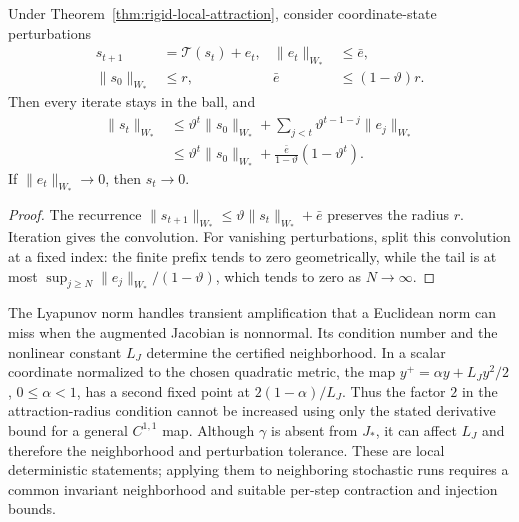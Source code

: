 \begin{corollary}
\label{cor:rigid-local-robustness}
Under Theorem~\ref{thm:rigid-local-attraction}, consider coordinate-state perturbations
\begin{align}
 s_{t+1}&=\mathcal T(s_t)+e_t,&\|e_t\|_{W_*}&\le\bar e,\\
 \|s_0\|_{W_*}&\le r,&\bar e&\le(1-\vartheta)r.
\end{align}
Then every iterate stays in the ball, and
\begin{align}
 \|s_t\|_{W_*}
 &\le\vartheta^t\|s_0\|_{W_*}
 +\sum_{j<t}\vartheta^{t-1-j}\|e_j\|_{W_*}\\
 &\le\vartheta^t\|s_0\|_{W_*}
 +\frac{\bar e}{1-\vartheta}(1-\vartheta^t).
\end{align}
If $\|e_t\|_{W_*}\to0$, then $s_t\to0$.
\end{corollary}
\begin{proof}
The recurrence $\|s_{t+1}\|_{W_*}\le\vartheta\|s_t\|_{W_*}+\bar e$ preserves the radius $r$. Iteration gives the convolution. For vanishing perturbations, split this convolution at a fixed index: the finite prefix tends to zero geometrically, while the tail is at most $\sup_{j\ge N}\|e_j\|_{W_*}/(1-\vartheta)$, which tends to zero as $N\to\infty$.
\end{proof}

The Lyapunov norm handles transient amplification that a Euclidean norm can miss when the augmented Jacobian is nonnormal. Its condition number and the nonlinear constant $L_J$ determine the certified neighborhood. In a scalar coordinate normalized to the chosen quadratic metric, the map $y^+=\alpha y+L_Jy^2/2$, $0\le\alpha<1$, has a second fixed point at $2(1-\alpha)/L_J$. Thus the factor $2$ in the attraction-radius condition cannot be increased using only the stated derivative bound for a general $C^{1,1}$ map. Although $\gamma$ is absent from $J_*$, it can affect $L_J$ and therefore the neighborhood and perturbation tolerance. These are local deterministic statements; applying them to neighboring stochastic runs requires a common invariant neighborhood and suitable per-step contraction and injection bounds.
